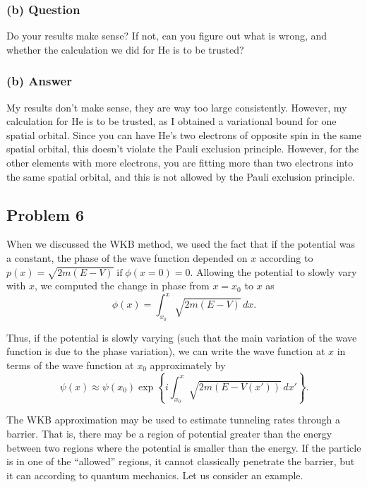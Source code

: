 \documentclass{article}
\begin{document}
\subsubsection*{(b) Question}
Do your results make sense? If not, can you figure out what is wrong, and whether the calculation we did for He is to be trusted?

\subsubsection*{(b) Answer}
My results don't make sense, they are way too large consistently. However, my calculation for He is to be trusted, as I obtained a variational bound for one spatial orbital. Since you can have He's two electrons of opposite spin in the same spatial orbital, this doesn't violate the Pauli exclusion principle. However, for the other elements with more electrons, you are fitting more than two electrons into the same spatial orbital, and this is not allowed by the Pauli exclusion principle.

\subsection*{Problem 6}
When we discussed the WKB method, we used the fact that if the potential was a constant, the phase of the wave function depended on \( x \) according to \( p(x) = \sqrt{2m(E-V)}\; \text{if}\; \phi(x = 0) = 0 \). Allowing the potential to slowly vary with \( x \), we computed the change in phase from \( x = x_0 \) to \( x \) as
\begin{equation}
    \phi(x) = \int_{x_0}^{x} \sqrt{2m(E-V)}\,dx.
\end{equation}

Thus, if the potential is slowly varying (such that the main variation of the wave function is due to the phase variation), we can write the wave function at \( x \) in terms of the wave function at \( x_0 \) approximately by
\begin{equation}
    \psi(x) \approx \psi(x_0) \exp \left\{ i \int_{x_0}^{x} \sqrt{2m(E-V(x'))}\,dx' \right\}.
\end{equation}

The WKB approximation may be used to estimate tunneling rates through a barrier. That is, there may be a region of potential greater than the energy between two regions where the potential is smaller than the energy. If the particle is in one of the ``allowed'' regions, it cannot classically penetrate the barrier, but it can according to quantum mechanics. Let us consider an example.
\end{document}
